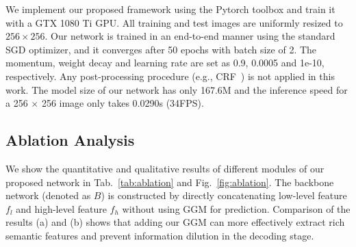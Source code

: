 \documentclass[runningheads]{llncs}
\begin{document}
We implement our proposed framework using the Pytorch toolbox and train it with a GTX 1080 Ti GPU.
All training and test images are uniformly resized to $256\times256$.
Our network is trained in an end-to-end manner using the standard SGD optimizer, and it converges after 50 epochs with batch size of 2.
The momentum, weight decay and learning rate are set as 0.9, 0.0005 and 1e-10, respectively.
Any post-processing procedure (e.g., CRF~\cite{CRF}) is not applied in this work.
The model size of our network has only 167.6M and the inference speed for a 256 $\times$ 256 image only takes 0.0290s (34FPS).







\subsection{Ablation Analysis}
We show the quantitative and qualitative results of different modules of our proposed network in Tab.~\ref{tab:ablation} and Fig.~\ref{fig:ablation}.
The backbone network (denoted as $B$) is constructed by directly concatenating low-level feature $f_l$ and high-level feature $f_h$ without using GGM for prediction.
Comparison of the results (a) and (b) shows that adding our GGM can more effectively extract rich semantic features and prevent information dilution in the decoding stage.
\end{document}
